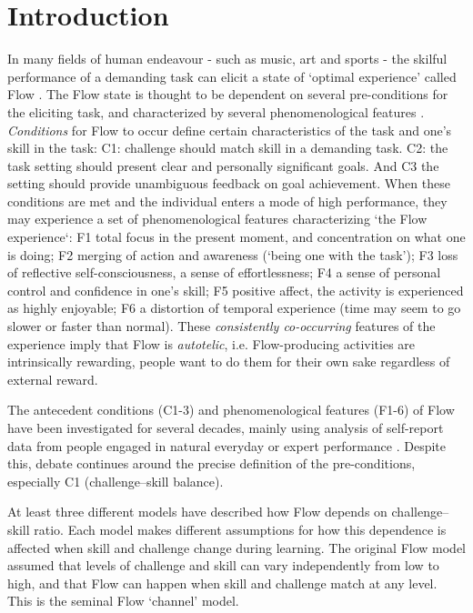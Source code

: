 \documentclass{frontierstyle/frontiersSCNS}
\newcommand{\hl}{\textcolor{red!80}}
\begin{document}
\section{Introduction}

In many fields of human endeavour - such as music, art and sports - the skilful performance of a demanding task can elicit a state of `optimal experience' called Flow \citep{Csikszentmihalyi1975}. \hl{The Flow state is thought to be dependent on several pre-conditions for the eliciting task, and characterized by several phenomenological features \citep{Nakamura2002,Engeser2012intro,Keller2012}. {\it Conditions} for Flow to occur define certain characteristics of the task and one's skill in the task}: {\sf C1}: challenge \hl{should} match skill in a demanding task. {\sf C2}: \hl{the task setting should present} clear and personally significant goals. And {\sf C3} \hl{the setting should provide} unambiguous feedback on goal achievement. When these conditions are met and the individual enters a mode of high performance, they may experience a set of phenomenological features \hl{characterizing `the Flow experience`}: {\sf F1} total focus in the present moment, and concentration on what one is doing; {\sf F2} merging of action and awareness (`being one with the task'); {\sf F3} loss of reflective self-consciousness, a sense of effortlessness; {\sf F4} a sense of personal control and confidence in one's skill; {\sf F5} positive affect, the activity is experienced as highly enjoyable; {\sf F6} a distortion of temporal experience (time may seem to go slower or faster than normal). These {\it consistently co-occurring} features of the experience imply that Flow is {\it autotelic}, i.e. Flow-producing activities are intrinsically rewarding, people want to do them for their own sake regardless of external reward.

The antecedent conditions ({\sf C1-3}) and phenomenological features ({\sf F1-6}) of Flow have been investigated for several decades, mainly using analysis of self-report data from people engaged in natural everyday or expert performance \citep{Csikszentmihalyi1971,Moneta2012}. Despite this, debate continues around the precise definition of the pre-conditions, especially {\sf C1} (challenge--skill balance). %

\hl{At least three different models have described how Flow depends on challenge--skill ratio. Each model makes different assumptions for how this dependence is affected when skill and challenge change during learning. The original Flow model \citep{Csikszentmihalyi1975} assumed that levels of challenge and skill can vary independently from low to high, and that Flow can happen when skill and challenge match at any level. This is the seminal Flow `channel' model.}
\end{document}
